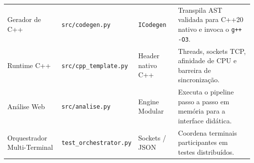 \begin{table}[htbp]
\begin{tabular}{p{3.2cm}p{3.8cm}p{2.8cm}p{5cm}}
Gerador de C++ & \texttt{src/codegen.py} & \texttt{ICodegen} & Transpila AST validada para C++20 nativo e invoca o \texttt{g++ -O3}. \\
Runtime C++ & \texttt{src/cpp\_template.py} & Header nativo C++ & Threads, sockets TCP, afinidade de CPU e barreira de sincronização. \\
Análise Web & \texttt{src/analise.py} & Engine Modular & Executa o pipeline passo a passo em memória para a interface didática. \\
Orquestrador Multi-Terminal & \texttt{test\_orchestrator.py} & Sockets / JSON & Coordena terminais participantes em testes distribuídos. \\
\bottomrule
\end{tabular}
\end{table}
